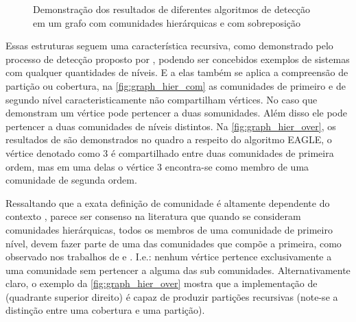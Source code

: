 \documentclass[notes.tex]{subfiles}
\begin{document}
\begin{figure}[htpb]
    \centering
    \caption{Demonstração dos resultados de diferentes algoritmos de detecção em um grafo com comunidades hierárquicas e com sobreposição}\label{fig:graph_hier_over}
\end{figure}

Essas estruturas seguem uma característica recursiva, como demonstrado pelo processo de detecção proposto por , podendo ser concebidos exemplos de sistemas com qualquer quantidades de níveis.
E a elas também se aplica a compreensão de partição ou cobertura, na \autoref{fig:graph_hier_com} as comunidades de primeiro e de segundo nível caracteristicamente não compartilham vértices.
No caso que demonstram  um vértice pode pertencer a duas somunidades.
Além disso ele pode pertencer a duas comunidades de níveis distintos.
Na \autoref{fig:graph_hier_over}, os resultados de  são demonstrados no quadro a respeito do algoritmo EAGLE, o vértice denotado como 3 é compartilhado entre duas comunidades de primeira ordem, mas em uma delas o vértice 3 encontra-se como membro de uma comunidade de segunda ordem.

Ressaltando que a exata definição de comunidade é altamente dependente do contexto \cite{fortunato2010community}, parece ser consenso na literatura que quando se consideram comunidades hierárquicas, todos os membros de uma comunidade de primeiro nível, devem fazer parte de uma das comunidades que compõe a primeira, como observado nos trabalhos de  e .
I.e.: nenhum vértice pertence exclusivamente a uma comunidade sem pertencer a alguma das sub comunidades.
Alternativamente claro, o exemplo da \autoref{fig:graph_hier_over} mostra que a implementação de  (quadrante superior direito) é capaz de produzir partições recursivas (note-se a distinção entre uma cobertura e uma partição).
\end{document}
